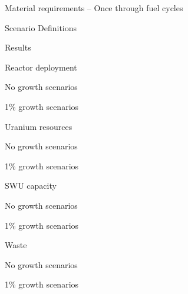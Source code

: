 \documentclass{report}
\begin{document}
\begin{outline}
\item Material requirements -- Once through fuel cycles
\begin{outline}
    \item Scenario Definitions
    \item Results
    \begin{outline}
        \item Reactor deployment
        \begin{outline}
            \item No growth scenarios
            \item 1\% growth scenarios
        \end{outline}
        \item Uranium resources
        \begin{outline}
            \item No growth scenarios
            \item 1\% growth scenarios
        \end{outline}
        \item SWU capacity
        \begin{outline}
            \item No growth scenarios
            \item 1\% growth scenarios
        \end{outline}
        \item Waste
        \begin{outline}
            \item No growth scenarios
            \item 1\% growth scenarios
        \end{outline}
    \end{outline}
\end{outline}


\end{outline}
\end{document}
